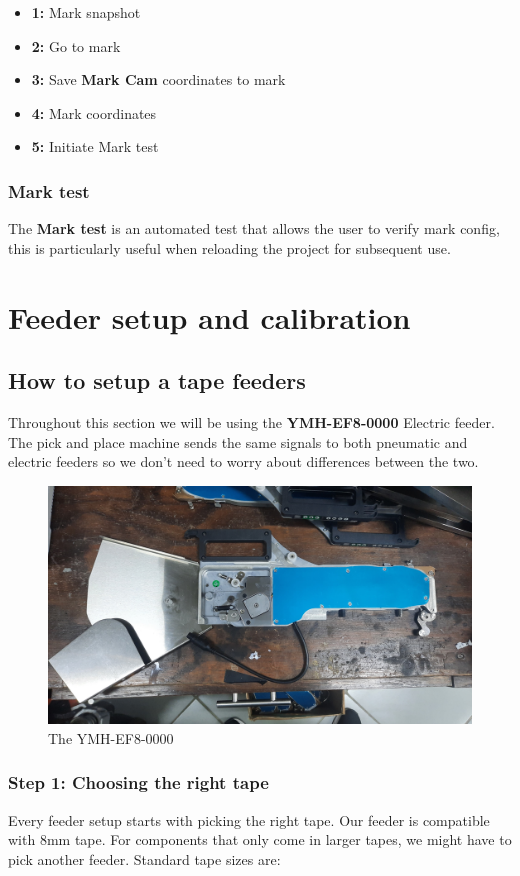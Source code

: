 \documentclass[a4paper,10pt]{report}
\begin{document}
\begin{itemize}
 \item \textbf{1: } Mark snapshot
 \item \textbf{2: } Go to mark
 \item \textbf{3: } Save \textbf{Mark Cam} coordinates to mark
 \item \textbf{4: } Mark coordinates
 \item \textbf{5: } Initiate Mark test
\end{itemize}

\subsubsection{Mark test}
The \textbf{Mark test} is an automated test that allows the user to verify mark config, this is particularly useful when reloading the project for subsequent use.
\newpage
\section{Feeder setup and calibration}
\subsection{How to setup a tape feeders}
Throughout this section we will be using the \textbf{YMH-EF8-0000} Electric feeder. The pick and place machine sends the same signals to both pneumatic and electric feeders so we don't need to worry about differences between the two.
\begin{figure}[!htb]
 \centering
 \includegraphics[width=1\textwidth]{images/feeder.jpg}
 \caption{The YMH-EF8-0000}
\end{figure}
\newpage
\subsubsection{Step 1: Choosing the right tape}
Every feeder setup starts with picking the right tape. Our feeder is compatible with 8mm tape. For components that only come in larger tapes, we might have to pick another feeder. Standard tape sizes are:
\end{document}
